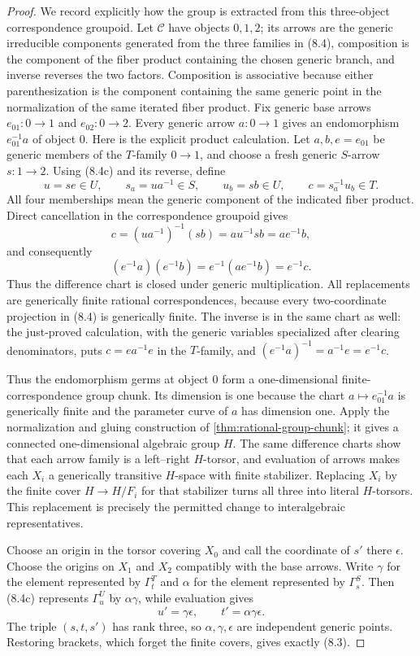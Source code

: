 \documentclass[11pt,oneside]{article}
\theoremstyle{definition}
\theoremstyle{remark}
\begin{document}
\begin{proof}
We record explicitly how the group is extracted from this three-object correspondence
groupoid.  Let $\mathcal C$ have objects $0,1,2$; its arrows are the generic irreducible
components generated from the three families in (8.4), composition is the component of
the fiber product containing the chosen generic branch, and inverse reverses the two
factors.  Composition is associative because either parenthesization is the component
containing the same generic point in the normalization of the same iterated fiber
product.  Fix generic base arrows $e_{01}:0\to1$ and $e_{02}:0\to2$.  Every generic
arrow $a:0\to1$ gives an endomorphism $e_{01}^{-1}a$ of object $0$.  Here is the explicit product
calculation.  Let $a,b,e=e_{01}$ be generic members of the $T$-family $0\to1$, and
choose a fresh generic $S$-arrow $s:1\to2$.  Using (8.4c) and its reverse, define
\[
 u=se\in U,\qquad s_a=ua^{-1}\in S,\qquad
 u_b=sb\in U,\qquad c=s_a^{-1}u_b\in T.
\]
All four memberships mean the generic component of the indicated fiber product.  Direct
cancellation in the correspondence groupoid gives
\[
 c=(ua^{-1})^{-1}(sb)=au^{-1}sb=ae^{-1}b,
\]
and consequently
\[
 (e^{-1}a)(e^{-1}b)=e^{-1}(ae^{-1}b)=e^{-1}c.
\]
Thus the difference chart is closed under generic multiplication.  All replacements are
generically finite rational correspondences, because every two-coordinate projection in
(8.4) is generically finite.
The inverse is in the same chart as well: the just-proved calculation, with the generic
variables specialized after clearing denominators, puts $c=ea^{-1}e$ in the $T$-family,
and $(e^{-1}a)^{-1}=a^{-1}e=e^{-1}c$.

Thus the endomorphism germs at object $0$ form a one-dimensional finite-correspondence
group chunk.  Its dimension is one because the chart
$a\mapsto e_{01}^{-1}a$ is generically finite and the parameter curve of $a$ has
dimension one.  Apply the normalization and gluing construction of
\cref{thm:rational-group-chunk}; it gives a connected one-dimensional algebraic group
$H$.  The same difference charts show that each arrow family is a left--right
$H$-torsor, and evaluation of arrows makes each $X_i$ a generically transitive
$H$-space with finite stabilizer.  Replacing $X_i$ by the finite cover $H\to H/F_i$ for
that stabilizer turns all three into literal $H$-torsors.  This replacement is precisely
the permitted change to interalgebraic representatives.

Choose an origin in the torsor covering $X_0$ and call the coordinate of $s'$ there
$\epsilon$.  Choose the origins on $X_1$ and $X_2$ compatibly with the base arrows.
Write $\gamma$ for the element represented by $\Gamma^T_t$ and $\alpha$ for the element
represented by $\Gamma^S_s$.  Then (8.4c) represents $\Gamma^U_u$ by
$\alpha\gamma$, while evaluation gives
\[
 u'=\gamma\epsilon,\qquad t'=\alpha\gamma\epsilon.
\]
The triple $(s,t,s')$ has rank three, so $\alpha,\gamma,\epsilon$ are independent
generic points.  Restoring brackets, which forget the finite covers, gives exactly
(8.3).
\end{proof}
\end{document}
